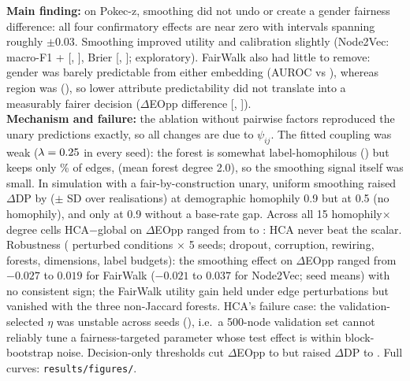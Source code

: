 \documentclass[11pt,a4paper]{article}
\begin{document}
\textbf{Main finding:} on Pokec-z, smoothing did not undo or create a gender fairness difference: all four confirmatory effects are near zero with intervals spanning roughly $\pm0.03$. Smoothing improved utility and calibration slightly (Node2Vec: macro-F1 +\RHtwoctxMacroF{} [\RHtwoctxMacroFLo, \RHtwoctxMacroFHi], Brier \RHtwoctxBrier{} [\RHtwoctxBrierLo, \RHtwoctxBrierHi]; exploratory). FairWalk also had little to remove: gender was barely predictable from either embedding (AUROC \RSensNVGender{} vs \RSensFwGender), whereas region was (\RSensNVRegion), so lower attribute predictability did not translate into a measurably fairer decision ($\Delta$EOpp difference \REoneDeoppG{} [\REoneDeoppGLo, \REoneDeoppGHi]).\\
\textbf{Mechanism and failure:} the ablation without pairwise factors reproduced the unary predictions exactly, so all changes are due to $\psi_{ij}$. The fitted coupling was weak ($\lambda=0.25$ in every seed): the forest is somewhat label-homophilous (\RForestHomLabel) but keeps only \RForestKept\% of edges, (mean forest degree 2.0), so the smoothing signal itself was small. In simulation with a fair-by-construction unary, uniform smoothing raised $\Delta$DP by \RSynHnineDoneSmoothDdpMean{} ($\pm$\RSynHnineDoneSmoothDdpSd{} SD over realisations) at demographic homophily 0.9 but \RSynHfiveDoneSmoothDdpMean{} at 0.5 (no homophily), and only \RSynNogapHnineDdp{} at 0.9 without a base-rate gap. Across all 15 homophily$\times$degree cells HCA$-$global on $\Delta$EOpp ranged from \RSynHcaglobMin{} to \RSynHcaglobMax{}: HCA never beat the scalar. Robustness (\RRobConditions{} perturbed conditions $\times$ 5 seeds; dropout, corruption, rewiring, forests, dimensions, label budgets): the smoothing effect on $\Delta$EOpp ranged from $-0.027$ to $0.019$ for FairWalk ($-0.021$ to $0.037$ for Node2Vec; seed means) with no consistent sign; the FairWalk utility gain held under edge perturbations but vanished with the three non-Jaccard forests. HCA's failure case: the validation-selected $\eta$ was unstable across seeds (\REtaFwList), i.e.\ a 500-node validation set cannot reliably tune a fairness-targeted parameter whose test effect is within block-bootstrap noise. Decision-only thresholds cut $\Delta$EOpp to \RNVThrDeoppG{} but raised $\Delta$DP to \RNVThrDdpG{}. Full curves: \texttt{results/figures/}.
\end{document}
